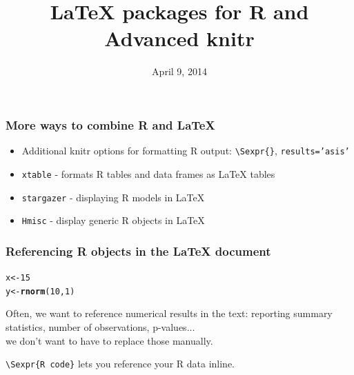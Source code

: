 \documentclass{beamer}\usepackage[]{graphicx}\usepackage[]{color}
\title[Dynamic Documents with knitr]{LaTeX packages for R and Advanced knitr}
\date{April 9, 2014}
\institute[ISU]{Iowa State University}
\makeatletter
\newcommand{\hlnum}[1]{\textcolor[rgb]{0.686,0.059,0.569}{#1}}%
\newcommand{\hlstd}[1]{\textcolor[rgb]{0.345,0.345,0.345}{#1}}%
\newcommand{\hlkwb}[1]{\textcolor[rgb]{0.69,0.353,0.396}{#1}}%
\newcommand{\hlkwd}[1]{\textcolor[rgb]{0.737,0.353,0.396}{\textbf{#1}}}%
\newenvironment{kframe}{%
 \def\at@end@of@kframe{}%
 \ifinner\ifhmode%
  \def\at@end@of@kframe{\end{minipage}}%
  \begin{minipage}{\columnwidth}%
 \fi\fi%
 \def\FrameCommand##1{\hskip\@totalleftmargin \hskip-\fboxsep
 \colorbox{shadecolor}{##1}\hskip-\fboxsep
     \hskip-\linewidth \hskip-\@totalleftmargin \hskip\columnwidth}%
 \MakeFramed {\advance\hsize-\width
   \@totalleftmargin\z@ \linewidth\hsize
   \@setminipage}}%
 {\par\unskip\endMakeFramed%
 \at@end@of@kframe}
\newenvironment{knitrout}{}{} %
\makeatother
\begin{document}

\begin{frame}
    \maketitle
\end{frame}


\begin{frame}[fragile]
\frametitle{More ways to combine R and LaTeX}
\begin{itemize}
\item Additional knitr options for formatting R output: \texttt{\textbackslash Sexpr\{\}}, \texttt{results='asis'}
\item \texttt{xtable} - formats R tables and data frames as LaTeX tables\medskip
\item \texttt{stargazer} - displaying R models in LaTeX\medskip
\item \texttt{Hmisc} - display generic R objects in LaTeX\medskip
\end{itemize}
\end{frame}


\begin{frame}[fragile]
\frametitle{Referencing R objects in the LaTeX document}
\begin{knitrout}\footnotesize
{}\color{fgcolor}\begin{kframe}
\begin{alltt}
\hlstd{x} \hlkwb{<-} \hlnum{15}
\hlstd{y} \hlkwb{<-} \hlkwd{rnorm}\hlstd{(}\hlnum{10}\hlstd{,} \hlnum{1}\hlstd{)}
\end{alltt}
\end{kframe}
\end{knitrout}

Often, we want to reference numerical results in the text: reporting summary statistics, number of observations, p-values... \\\hfill we don't want to have to replace those manually.\bigskip\bigskip

\texttt{\textbackslash Sexpr\{R code\}} lets you reference your R data inline. 
\end{frame}

\end{document}
